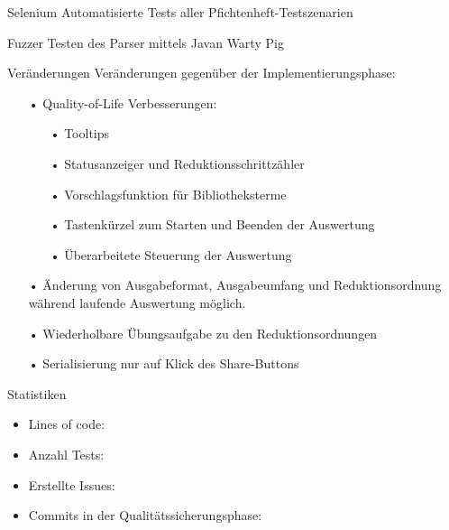 \documentclass[10pt]{beamer}
\begin{document}
\begin{frame}{Selenium}
Automatisierte Tests aller Pfichtenheft-Testszenarien
\end{frame}

\begin{frame} {Fuzzer}
Testen des Parser mittels Javan Warty Pig
\end{frame}

\begin{frame}{Veränderungen}
Veränderungen gegenüber der Implementierungsphase:
\begin{itemize}
\item[•] Quality-of-Life Verbesserungen:
\begin{itemize}
\item[•] Tooltips
\item[•] Statusanzeiger und Reduktionsschrittzähler
\item[•] Vorschlagsfunktion für Bibliotheksterme
\item[•] Tastenkürzel zum Starten und Beenden der Auswertung
\item[•] Überarbeitete Steuerung der Auswertung
\end{itemize}
\item[•] Änderung von Ausgabeformat, Ausgabeumfang und Reduktionsordnung während laufende Auswertung möglich.
\item[•] Wiederholbare Übungsaufgabe zu den Reduktionsordnungen
\item[•] Serialisierung nur auf Klick des Share-Buttons
\end{itemize}
\end{frame}

\begin{frame}{Statistiken} %
\begin{itemize}
\item Lines of code:
\item Anzahl Tests:
\item Erstellte Issues:
\item Commits in der Qualitätssicherungsphase:
\end{itemize}
\end{frame}
\end{document}
